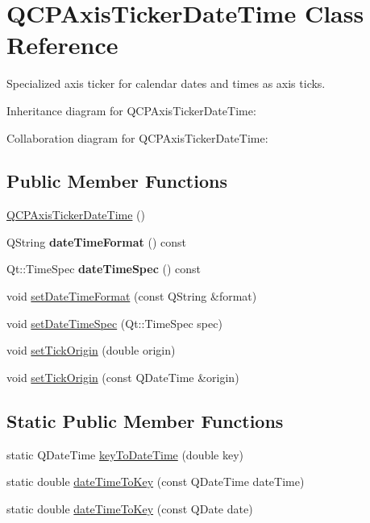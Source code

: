 \hypertarget{classQCPAxisTickerDateTime}{}\section{Q\+C\+P\+Axis\+Ticker\+Date\+Time Class Reference}
\label{classQCPAxisTickerDateTime}


Specialized axis ticker for calendar dates and times as axis ticks.  




Inheritance diagram for Q\+C\+P\+Axis\+Ticker\+Date\+Time\+:


Collaboration diagram for Q\+C\+P\+Axis\+Ticker\+Date\+Time\+:
\subsection*{Public Member Functions}
\begin{DoxyCompactItemize}
\item 
\hyperlink{classQCPAxisTickerDateTime_a84cc5c6bbc7c99c1f9bd4b3a392e1b9d}{Q\+C\+P\+Axis\+Ticker\+Date\+Time} ()
\item 
Q\+String {\bfseries date\+Time\+Format} () const \hypertarget{classQCPAxisTickerDateTime_a19d4302f3d58b5c05e7e943c6e7c5b57}{}\label{classQCPAxisTickerDateTime_a19d4302f3d58b5c05e7e943c6e7c5b57}

\item 
Qt\+::\+Time\+Spec {\bfseries date\+Time\+Spec} () const \hypertarget{classQCPAxisTickerDateTime_a231ff3f1e970255bf874b50fd742ff18}{}\label{classQCPAxisTickerDateTime_a231ff3f1e970255bf874b50fd742ff18}

\item 
void \hyperlink{classQCPAxisTickerDateTime_ad52660a82f688395468674d555f6a86b}{set\+Date\+Time\+Format} (const Q\+String \&format)
\item 
void \hyperlink{classQCPAxisTickerDateTime_afbd987c7197e42ab61e67fb1c38abebc}{set\+Date\+Time\+Spec} (Qt\+::\+Time\+Spec spec)
\item 
void \hyperlink{classQCPAxisTickerDateTime_a5388e048cbd32cf1ba730b9f1859eb5c}{set\+Tick\+Origin} (double origin)
\item 
void \hyperlink{classQCPAxisTickerDateTime_a2ea905872b8171847a49a5e093fb0c48}{set\+Tick\+Origin} (const Q\+Date\+Time \&origin)
\end{DoxyCompactItemize}
\subsection*{Static Public Member Functions}
\begin{DoxyCompactItemize}
\item 
static Q\+Date\+Time \hyperlink{classQCPAxisTickerDateTime_a4c1761ad057f5564804a53f942629b53}{key\+To\+Date\+Time} (double key)
\item 
static double \hyperlink{classQCPAxisTickerDateTime_aa24f293f16fff0f937bf71f4140033f1}{date\+Time\+To\+Key} (const Q\+Date\+Time date\+Time)
\item 
static double \hyperlink{classQCPAxisTickerDateTime_ad87afc7dba65843f68da5ca88bc004f4}{date\+Time\+To\+Key} (const Q\+Date date)
\end{DoxyCompactItemize}
